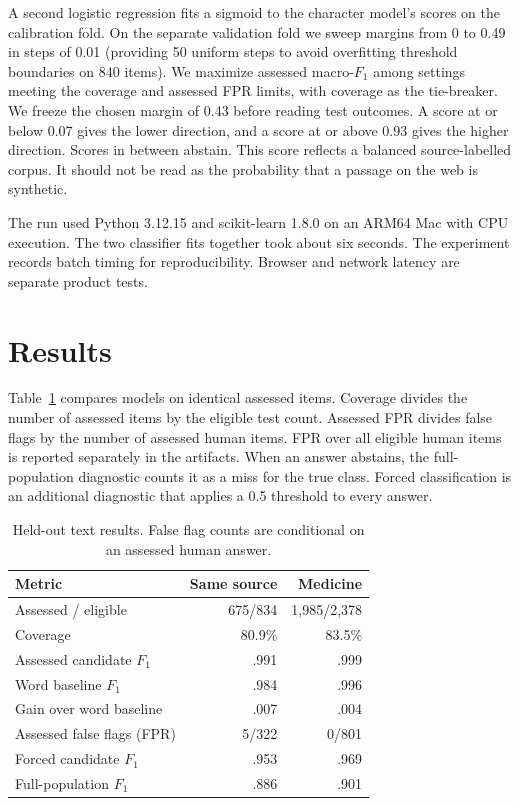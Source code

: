\documentclass[11pt]{article}
\begin{document}
A second logistic regression fits a sigmoid to the character model's scores on the calibration fold. On the separate validation fold we sweep margins from 0 to 0.49 in steps of 0.01 (providing 50 uniform steps to avoid overfitting threshold boundaries on 840 items). We maximize assessed macro-$F_1$ among settings meeting the coverage and assessed FPR limits, with coverage as the tie-breaker. We freeze the chosen margin of 0.43 before reading test outcomes. A score at or below 0.07 gives the lower direction, and a score at or above 0.93 gives the higher direction. Scores in between abstain. This score reflects a balanced source-labelled corpus. It should not be read as the probability that a passage on the web is synthetic.

The run used Python 3.12.15 and scikit-learn 1.8.0 on an ARM64 Mac with CPU execution. The two classifier fits together took about six seconds. The experiment records batch timing for reproducibility. Browser and network latency are separate product tests.

\section{Results}

Table~\ref{tab:results} compares models on identical assessed items. Coverage divides the number of assessed items by the eligible test count. Assessed FPR divides false flags by the number of assessed human items. FPR over all eligible human items is reported separately in the artifacts. When an answer abstains, the full-population diagnostic counts it as a miss for the true class. Forced classification is an additional diagnostic that applies a 0.5 threshold to every answer.

\begin{table}[h]
\centering
\small
\begin{tabular}{@{}lrr@{}}
\toprule
Metric & Same source & Medicine \\
\midrule
Assessed / eligible & 675/834 & 1,985/2,378 \\
Coverage & 80.9\% & 83.5\% \\
Assessed candidate $F_1$ & .991 & .999 \\
Word baseline $F_1$ & .984 & .996 \\
Gain over word baseline & .007 & .004 \\
Assessed false flags (FPR) & 5/322 & 0/801 \\
Forced candidate $F_1$ & .953 & .969 \\
Full-population $F_1$ & .886 & .901 \\
\bottomrule
\end{tabular}
\caption{Held-out text results. False flag counts are conditional on an assessed human answer.}
\label{tab:results}
\end{table}
\end{document}
